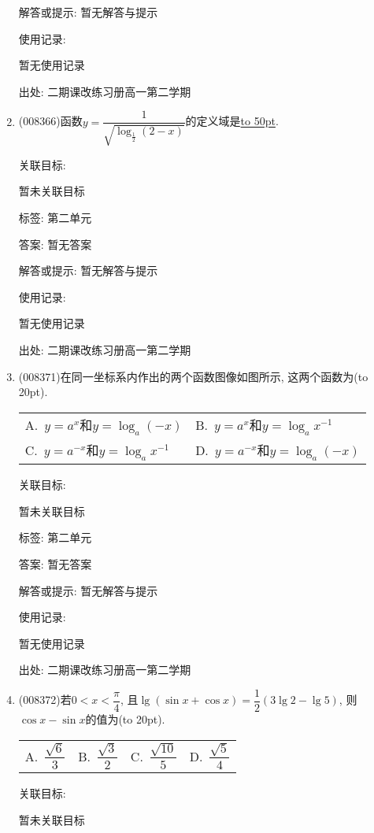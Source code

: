 \documentclass[10pt,a4paper]{article}
\newcommand{\blank}[1]{\underline{\hbox to #1pt{}}}
\newcommand{\bracket}[1]{(\hbox to #1pt{})}
\newcommand{\twoch}[4]{\par\begin{tabular}{p{.46\textwidth}p{.46\textwidth}}
A.~#1& B.~#2\\
C.~#3& D.~#4
\end{tabular}}
\newcommand{\fourch}[4]{\par\begin{tabular}{p{.23\textwidth}p{.23\textwidth}p{.23\textwidth}p{.23\textwidth}}
A.~#1 &B.~#2& C.~#3& D.~#4
\end{tabular}}
\begin{document}
\begin{enumerate}[1.]
解答或提示: 暂无解答与提示

使用记录:

暂无使用记录


出处: 二期课改练习册高一第二学期
\item { (008366)}函数$y=\dfrac 1{\sqrt {\log _{\frac 12}(2-x)}}$的定义域是\blank{50}.


关联目标:

暂未关联目标



标签: 第二单元

答案: 暂无答案

解答或提示: 暂无解答与提示

使用记录:

暂无使用记录


出处: 二期课改练习册高一第二学期
\item { (008371)}在同一坐标系内作出的两个函数图像如图所示, 这两个函数为\bracket{20}.
\begin{center}
\end{center}
\twoch{$y=a^x$和$y=\log _a(-x)$}{$y=a^x$和$y=\log _ax^{-1}$}{$y=a^{-x}$和$y=\log _ax^{-1}$}{$y=a^{-x}$和$y=\log _a(-x)$}


关联目标:

暂未关联目标



标签: 第二单元

答案: 暂无答案

解答或提示: 暂无解答与提示

使用记录:

暂无使用记录


出处: 二期课改练习册高一第二学期
\item { (008372)}若$0<x<\dfrac{\pi}4$, 且$\lg (\sin x+\cos x)=\dfrac 12(3\lg 2-\lg 5)$, 则$\cos x-\sin x$的值为\bracket{20}.
\fourch{$\dfrac{\sqrt 6}3$}{$\dfrac{\sqrt 3}2$}{$\dfrac{\sqrt {10}}5$}{$\dfrac{\sqrt 5}4$}


关联目标:

暂未关联目标




\end{enumerate}
\end{document}

